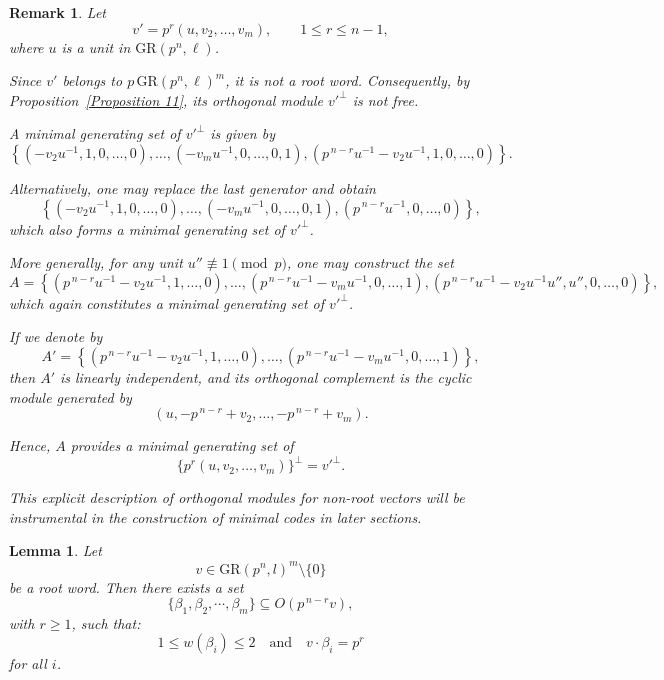 \documentclass[10pt,a4paper]{amsart}
\newtheorem{remark}{Remark}
\newtheorem{lemma}{Lemma}
\begin{document}
\begin{remark}\label{Remark 12}
Let
\[
v' = p^{r}(u,v_2,\dots,v_m),
\qquad 1 \le r \le n-1,
\]
where $u$ is a unit in $\mathrm{GR}(p^{n},\ell)$.

Since $v'$ belongs to $p\,\mathrm{GR}(p^{n},\ell)^m$,
it is not a root word.
Consequently, by Proposition~\ref{Proposition 11},
its orthogonal module $v'^{\perp}$ is not free.

A minimal generating set of $v'^{\perp}$ is given by
\[
\left\{
(-v_2u^{-1},1,0,\dots,0),\dots,
(-v_mu^{-1},0,\dots,0,1),
(p^{\,n-r}u^{-1}-v_2u^{-1},1,0,\dots,0)
\right\}.
\]

Alternatively, one may replace the last generator and obtain
\[
\left\{
(-v_2u^{-1},1,0,\dots,0),\dots,
(-v_mu^{-1},0,\dots,0,1),
(p^{\,n-r}u^{-1},0,\dots,0)
\right\},
\]
which also forms a minimal generating set of $v'^{\perp}$.

More generally, for any unit $u'' \not\equiv 1 \pmod p$,
one may construct the set
\[
A=
\left\{
(p^{\,n-r}u^{-1}-v_2u^{-1},1,\dots,0),
\dots,
(p^{\,n-r}u^{-1}-v_mu^{-1},0,\dots,1),
(p^{\,n-r}u^{-1}-v_2u^{-1}u'',u'',0,\dots,0)
\right\},
\]
which again constitutes a minimal generating set of $v'^{\perp}$.

If we denote by
\[
A'=
\left\{
(p^{\,n-r}u^{-1}-v_2u^{-1},1,\dots,0),
\dots,
(p^{\,n-r}u^{-1}-v_mu^{-1},0,\dots,1)
\right\},
\]
then $A'$ is linearly independent, and its orthogonal complement
is the cyclic module generated by
\[
(u,-p^{\,n-r}+v_2,\dots,-p^{\,n-r}+v_m).
\]

Hence, $A$ provides a minimal generating set of
\[
\{p^{r}(u,v_2,\dots,v_m)\}^{\perp}
=
v'^{\perp}.
\]

This explicit description of orthogonal modules
for non-root vectors will be instrumental in the construction
of minimal codes in later sections.
\end{remark}

\begin{lemma}\label{Lemma 26}
Let
\[
v\in \mathrm{GR}(p^n,l)^m\setminus\{0\}
\]
be a root word. Then there exists a set
\[
\{\beta_1,\beta_2,\cdots,\beta_m\}
\subseteq O(p^{\,n-r}v),
\]
with $r\ge 1$, such that:
\[
1\leq w(\beta_i)\leq 2
\quad \text{and} \quad
v\cdot \beta_i=p^r
\]
for all $i$.
\end{lemma}
\end{document}
